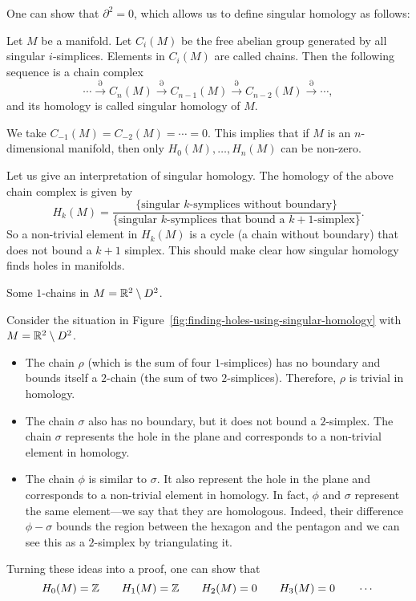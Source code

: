 One can show that $\partial^2 = 0$, which allows us to define singular homology as follows:
\begin{definition}
    Let $M$ be a manifold.
    Let $C_i(M)$ be the free abelian group generated by all singular  $i$-simplices.
    Elements in $C_i(M)$ are called chains.
    Then the following sequence is a chain complex
    \[
        \cdots \xrightarrow{\partial} C_n(M) \xrightarrow{\partial}  C_{n-1}(M) \xrightarrow{\partial}  C_{n-2}(M) \xrightarrow{\partial}  \cdots
    ,\] 
    and its homology is called singular homology of $M$.
\end{definition}
\begin{remark}
    We take $C_{-1}(M) = C_{-2}(M) = \cdots = 0$.
    This implies that if $M$ is an $n$-dimensional manifold, then only $H_0(M), \ldots, H_n(M)$ can be non-zero.
\end{remark}
Let us give an interpretation of singular homology.
The homology of the above chain complex is given by
\[
    H_k(M) = \frac{\{ \text{singular $k$-symplices without boundary}\}}{\{\text{singular $k$-symplices that bound a $k+1$-simplex}\}}
.\] 
So a non-trivial element in $H_k(M)$ is a cycle (a chain without boundary) that does not bound a $k+1$ simplex.
This should make clear how singular homology finds holes in manifolds.
\begin{eg}
    \begin{marginfigure}
        \centering
        \caption{Some $1$-chains in $M = \mathbb{R}^2 \setminus D^2$.}
        \label{fig:finding-holes-using-singular-homology}
    \end{marginfigure}

    Consider the situation in Figure~\ref{fig:finding-holes-using-singular-homology} with $M = \mathbb{R}^2 \setminus D^2$.
    \begin{itemize}
        \item The chain $\rho$ (which is the sum of four $1$-simplices) has no boundary and bounds itself a $2$-chain (the sum of two $2$-simplices).
            Therefore, $\rho$ is trivial in homology.
        \item The chain $\sigma$ also has no boundary, but it does not bound a $2$-simplex. The chain $\sigma$ represents the hole in the plane and corresponds to a non-trivial element in homology.
        \item The chain $\phi$ is similar to $\sigma$. It also represent the hole in the plane and corresponds to a non-trivial element in homology.
            In fact, $\phi$ and  $\sigma$ represent the same element---we say that they are homologous.
            Indeed, their difference $\phi - \sigma$ bounds the region between the hexagon and the pentagon and we can see this as a $2$-simplex by triangulating it.
    \end{itemize}
    Turning these ideas into a proof, one can show that
    \[
        H_0(M) = \mathbb{Z} \qquad 
        H_1(M) = \mathbb{Z} \qquad 
        H_2(M) = 0 \qquad
        H_3(M) = 0 \qquad \cdots
    \] 
\end{eg}
